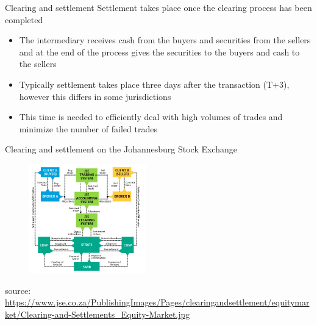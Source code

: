 \documentclass[10pt]{beamer}
\begin{document}

\begin{frame}{Clearing and settlement}
	Settlement takes place once the clearing process has been completed
	\begin{itemize}
		\item The intermediary receives cash from the buyers and securities from the sellers and at the end of the process gives the securities to the buyers and cash to the sellers
		\item Typically settlement takes place three days after the transaction (T+3), however this differs in some jurisdictions
		\item This time is needed to efficiently deal with high volumes of trades and minimize the number of failed trades
	\end{itemize}
\end{frame}


\begin{frame}{Clearing and settlement on the Johannesburg Stock Exchange}
	\begin{figure}[]
		\centering
		\includegraphics  [width=2in]{Images/settle}
	\end{figure}
	\begin{scriptsize}
		source: \href{https://www.jse.co.za/services/post-trade-services/clearing-and-settlement/cash-equities}{https://www.jse.co.za/PublishingImages/Pages/clearingandsettlement/equitymarket/Clearing-and-Settlements\_Equity-Market.jpg}
	\end{scriptsize}
\end{frame}


\end{document}
